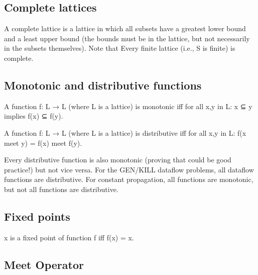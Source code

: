 \subsection{Complete lattices}


A complete lattice is a lattice in which all subsets have a greatest lower bound 
and a least upper bound (the bounds must be in the lattice, but not necessarily 
in the subsets themselves). Note that Every finite lattice (i.e., S is finite) is complete.


\subsection{Monotonic and distributive functions}

A function f: L → L (where L is a lattice) is monotonic iff for all x,y in L: x ⊆ y implies f(x) ⊆ f(y).

A function f: L → L (where L is a lattice) is distributive iff for all x,y in L: f(x meet y) = f(x) meet f(y).

Every distributive function is also monotonic (proving that could be good practice!) but not vice versa. For the GEN/KILL dataflow problems, all dataflow functions are distributive. For constant propagation, all functions are monotonic, but not all functions are distributive.


\subsection{Fixed points}

x is a fixed point of function f iff f(x) = x.

\subsection{Meet Operator}


